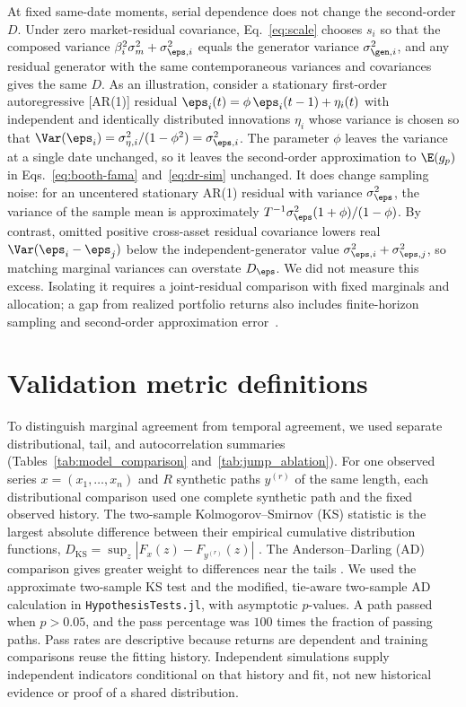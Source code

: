 At fixed same-date moments, serial dependence does not change the second-order $D$. Under zero market-residual covariance,
Eq.~\eqref{eq:scale} chooses $s_i$ so that the composed variance $\beta_i^2\sigma_m^2+\sigma_{\eps,i}^2$ equals the
generator variance $\sigma_{\gen,i}^2$, and any residual generator
with the same contemporaneous variances and covariances gives the same $D$. As an
illustration, consider a stationary first-order autoregressive
[AR(1)] residual $\eps_i(t) = \phi\, \eps_i(t-1) + \eta_i(t)$ with
independent and identically distributed innovations $\eta_i$ whose
variance is chosen so that
$\Var(\eps_i) = \sigma_{\eta,i}^2 / (1 - \phi^2) = \sigma_{\eps,i}^2$.
The parameter $\phi$ leaves the variance at a single date unchanged,
so it leaves the second-order approximation to $\E(g_p)$ in Eqs.~\eqref{eq:booth-fama} and~\eqref{eq:dr-sim} unchanged. It does change sampling noise: for an
uncentered stationary AR(1) residual with variance $\sigma_\eps^2$,
the variance of the sample mean is approximately
$T^{-1}\sigma_\eps^2(1+\phi)/(1-\phi)$.
By contrast, omitted positive cross-asset residual covariance lowers real $\Var(\eps_i-\eps_j)$ below the independent-generator value $\sigma_{\eps,i}^2+\sigma_{\eps,j}^2$, so matching marginal variances can overstate $D_\eps$. We did not measure this excess. Isolating it requires a joint-residual comparison with fixed marginals and allocation; a gap from realized portfolio returns also includes finite-horizon sampling and second-order approximation error~\cite{boucheyNemtchinovWong2015}.

\section{Validation metric definitions}
\label{sec:supp-validation}

To distinguish marginal agreement from temporal agreement, we used
separate distributional, tail, and autocorrelation summaries
(Tables~\ref{tab:model_comparison} and~\ref{tab:jump_ablation}).
 For one observed series $x=(x_1,\ldots,x_n)$ and $R$ synthetic
paths $y^{(r)}$ of the same length, each distributional comparison
used one complete synthetic path and the fixed observed history.
The two-sample Kolmogorov--Smirnov (KS) statistic is the largest
absolute difference between their empirical cumulative distribution
functions, $D_{\mathrm{KS}}=\sup_z|F_x(z)-F_{y^{(r)}}(z)|$
\cite{kolmogorov1933,smirnov1948}. The Anderson--Darling (AD)
comparison gives greater weight to differences near the tails
\cite{andersonDarling1952}. We used the approximate two-sample KS
test and the modified, tie-aware two-sample AD calculation in
\texttt{HypothesisTests.jl}, with asymptotic $p$-values. A path
passed when $p>0.05$, and the pass percentage was $100$ times the
fraction of passing paths. Pass rates are descriptive because returns are dependent and training comparisons reuse the fitting history. Independent simulations supply independent indicators conditional on that history and fit, not new historical evidence or proof of a shared distribution.

